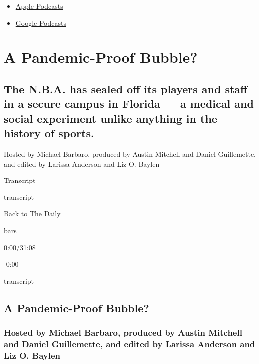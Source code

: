 \begin{itemize}
\tightlist
\item
  \href{https://itunes.apple.com/us/podcast/id1200361736}{Apple
  Podcasts}
\item
  \href{https://www.google.com/podcasts?feed=aHR0cHM6Ly9yc3MuYXJ0MTkuY29tL3RoZS1kYWlseQ\%3D\%3D}{Google
  Podcasts}
\end{itemize}

\hypertarget{a-pandemic-proof-bubble-1}{%
\section{A Pandemic-Proof Bubble?}\label{a-pandemic-proof-bubble-1}}

\hypertarget{the-nba-has-sealed-off-its-players-and-staff-in-a-secure-campus-in-florida--a-medical-and-social-experiment-unlike-anything-in-the-history-of-sports-1}{%
\subsection{The N.B.A. has sealed off its players and staff in a secure
campus in Florida --- a medical and social experiment unlike anything in
the history of
sports.}\label{the-nba-has-sealed-off-its-players-and-staff-in-a-secure-campus-in-florida--a-medical-and-social-experiment-unlike-anything-in-the-history-of-sports-1}}

Hosted by Michael Barbaro, produced by Austin Mitchell and Daniel
Guillemette, and edited by Larissa Anderson and Liz O. Baylen

Transcript

transcript

Back to The Daily

bars

0:00/31:08

-0:00

transcript

\hypertarget{a-pandemic-proof-bubble-2}{%
\subsection{A Pandemic-Proof Bubble?}\label{a-pandemic-proof-bubble-2}}

\hypertarget{hosted-by-michael-barbaro-produced-by-austin-mitchell-and-daniel-guillemette-and-edited-by-larissa-anderson-and-liz-o-baylen-1}{%
\subsubsection{Hosted by Michael Barbaro, produced by Austin Mitchell
and Daniel Guillemette, and edited by Larissa Anderson and Liz O.
Baylen}\label{hosted-by-michael-barbaro-produced-by-austin-mitchell-and-daniel-guillemette-and-edited-by-larissa-anderson-and-liz-o-baylen-1}}

